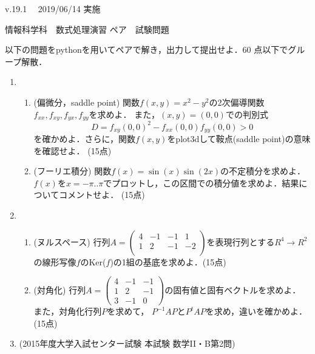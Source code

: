 \documentclass[12pt,a4j]{jarticle}
\begin{document}
\small{v.19.1}　
\hfill\small{2019/06/14 実施}
\begin{center}
{\gt\large{情報科学科　数式処理演習 ペア　試験問題}}
\end{center}
\vspace{5mm}

以下の問題をpythonを用いてペアで解き，出力して提出せよ．60 点以下でグループ解散．

\begin{enumerate}

\item 
\begin{enumerate}
\item
  (偏微分，saddle point)
  関数$f(x,y)=x^2 - y^2$の2次偏導関数$f_{xx}, f_{xy}, f_{yx}, f_{yy}$を求めよ．
  また，$(x,y)=(0,0)$での判別式
  \begin{equation*}
    D = {f_{xy}(0,0)}^2-f_{xx}(0,0)f_{yy}(0,0) > 0
  \end{equation*}
  を確かめよ．さらに，関数$f(x,y)$をplot3dして鞍点(saddle point)の意味を確認せよ．
  (15点)
  
\item 
  (フーリエ積分)
  関数$f(x)= \sin(x) \sin(2x)$の不定積分を求めよ．$f(x)$を$x=-\pi..\pi$でプロットし，この区間での積分値を求めよ．結果についてコメントせよ．
  (15点)
\end{enumerate}

\item 
\begin{enumerate}
\item 
(ヌルスペース)
行列$A = \left(\begin{array}{cccc}
4 & -1 & -1 & 1\\
1 & 2 & -1 & -2\\
\end{array}
\right)
$を表現行列とする$R^4\rightarrow R^2$の線形写像$f$のKer($f$)の1組の基底を求めよ．(15点)

\item
(対角化)
行列$A = \left(\begin{array}{cccc}
4 & -1 & -1 \\
1 & 2 & -1 \\
3 & -1 & 0
\end{array}
\right)
$の固有値と固有ベクトルを求めよ．
また，対角化行列$P$を求めて，
$P^{-1}AP$と$P^{t}AP$を求め，違いを確かめよ．(15点)
\end{enumerate}


\item (2015年度大学入試センター試験 本試験 数学II・B第2問)


\end{enumerate}
\end{document}
